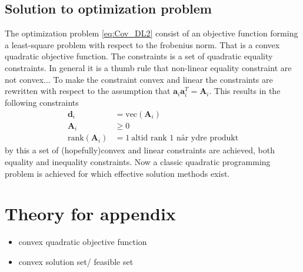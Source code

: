 \subsection{Solution to optimization problem}
The optimization problem \eqref{eq:Cov_DL2} consist of an objective function forming a least-square problem with respect to the frobenius norm.
That is a convex quadratic objective function.
The constraints is a set of quadratic equality constraints. In general it is a thumb rule that non-linear equality constraint are not convex...
To make the constraint convex and linear the constraints are rewritten with respect to the assumption that $\textbf{a}_i\textbf{a}_i^{T} = \textbf{A}_i$. This results in the following constraints 
\begin{align}
\textbf{d}_i &= \text{vec}(\textbf{A}_i) \\
\textbf{A}_i &\geq  0 \\
\text{rank}(\textbf{A}_i) &= 1 \ \text{altid rank 1 når ydre produkt}
\end{align}          
by this a set of (hopefully)convex and linear constraints are achieved, both equality and inequality constraints.
Now a classic quadratic programming problem is achieved      for which effective solution methods exist.   

\section{Theory for appendix}
\begin{itemize}
\item convex quadratic objective function
\item convex solution set/ feasible set 

\end{itemize}

